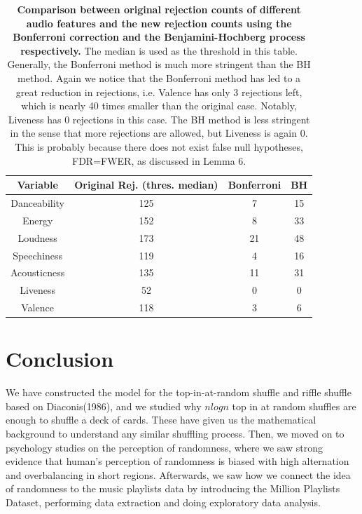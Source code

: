 \documentclass[12pt]{article}
\theoremstyle{plain}
\theoremstyle{definition}
\theoremstyle{remark}
\begin{document}
\begin{table}[h!]
    \centering
    \begin{tabular}{|c|c|c|c|}
       \hline
       Variable & Original Rej. (thres. median) & Bonferroni & BH\\
       \hline
        Danceability &125 &7&15\\
        \hline
        Energy & 152&8&33\\
        \hline
        Loudness & 173&21&48\\
        \hline
        Speechiness & 119&4&16\\
        \hline
        Acousticness &135 &11&31\\
        \hline
        Liveness &52 &0&0\\
        \hline
        Valence & 118&3&6\\
        \hline
    \end{tabular}
    \caption{\textbf{Comparison between original rejection counts of different audio features and the new rejection counts using the Bonferroni correction and the Benjamini-Hochberg process respectively.} The median is used as the threshold in this table. Generally, the Bonferroni method is much more stringent than the BH method. Again we notice that the Bonferroni method has led to a great reduction in rejections, i.e. Valence has only 3 rejections left, which is nearly 40 times smaller than the original case. Notably, Liveness has 0 rejections in this case. The BH method is less stringent in the sense that more rejections are allowed, but Liveness is again 0. This is probably because there does not exist false null hypotheses, FDR=FWER, as discussed in Lemma 6. }
    \label{table 6}
\end{table}
\clearpage


\section{Conclusion}
We have constructed the model for the top-in-at-random shuffle and riffle shuffle based on Diaconis(1986), and we studied why $nlogn$ top in at random shuffles are enough to shuffle a deck of cards. These have given us the mathematical background to understand any similar shuffling process. Then, we moved on to psychology studies on the perception of randomness, where we saw strong evidence that human's perception of randomness is biased with high alternation and overbalancing in short regions. Afterwards, we saw how we connect the idea of randomness to the music playlists data by introducing the Million Playlists Dataset, performing data extraction and doing exploratory data analysis. 
\end{document}
